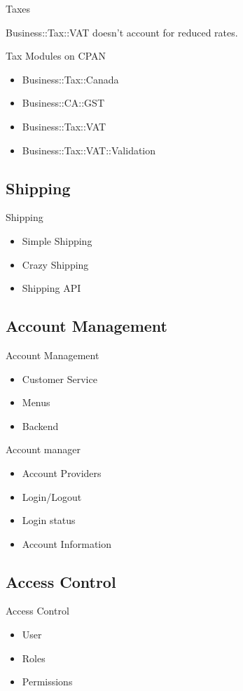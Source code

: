 \begin{frame}{Taxes}
\end{frame}

Business::Tax::VAT doesn't account for reduced rates.

\begin{frame}{Tax Modules on CPAN}
\begin{itemize}
\item Business::Tax::Canada
\item Business::CA::GST
\item Business::Tax::VAT
\item Business::Tax::VAT::Validation
\end{itemize}
\end{frame}

\subsection{Shipping}
\begin{frame}{Shipping}
\begin{itemize}
\item Simple Shipping
\item Crazy Shipping
\item Shipping API
\end{itemize}
\end{frame}

\subsection{Account Management}
\begin{frame}{Account Management}
\begin{itemize}
\item Customer Service
\item Menus
\item Backend
\end{itemize}
\end{frame}

\begin{frame}{Account manager}
\begin{itemize}
\item Account Providers
\item Login/Logout
\item Login status
\item Account Information
\end{itemize}

\end{frame}
\subsection{Access Control}
\begin{frame}{Access Control}
\begin{itemize}
\item User
\item Roles
\item Permissions
\end{itemize}
\end{frame}

